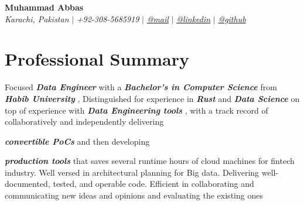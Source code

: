 \documentclass[letterpaper,10pt]{article}
\newcommand{\sectionspace}{
\vspace{-15pt}
}
\newcommand{\highlight}[1]{
  \textsl{\textbf{#1}}
}
\begin{document}

\begin{flushleft}
	\textbf{\large Muhammad Abbas} \\
	\textit{Karachi, Pakistan} $|$
	\textit{+92-308-5685919} $|$
	\href{mailto:abbastaqvi81@gmail.com}{{\textit{@mail}}} $|$
	\href{https://linkedin.com/in/abbastaqvi}{{\textit{@linkedin}}} $|$
	\href{https://github.com/smabbasht}{{\textit{@github}}}
	\vspace{-8pt}
\end{flushleft}


\section{Professional Summary}
\vspace{-3pt}
\begin{itemize}[leftmargin=0.15in, label={}]
	{\item{
            {Focused \highlight{Data Engineer} with a \highlight{Bachelor's in
            Computer Science} from \highlight{Habib University}, Distinguished
            for experience in \highlight{Rust} and \highlight{Data Science} on
            top of experience with \highlight{Data Engineering tools}, with a
            track record of collaboratively and independently delivering
            \highlight{convertible PoCs} and then developing
            \highlight{production tools} that saves several runtime hours of
            cloud machines for fintech industry. Well versed in architectural
            planning for Big data. Delivering well-documented, tested, and
            operable code. Efficient in collaborating and communicating new
            ideas and opinions and evaluating the existing ones}
          \\ 
    }}
\end{itemize}
\sectionspace

\end{document}
